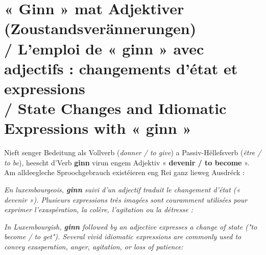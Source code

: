 \vspace{1.5em}

\section[Ginn mat Adjektiver / Ginn with Adjectives]{« Ginn » mat Adjektiver (Zoustandsverännerungen) \\/ L'emploi de « ginn » avec adjectifs : changements d'état et expressions \\/ State Changes and Idiomatic Expressions with « ginn »}

Nieft senger Bedeitung als Vollverb (\textit{donner / to give}) a Passiv-Hëllefsverb (\textit{être / to be}), heescht d'Verb \textbf{ginn} virun engem Adjektiv « \textbf{devenir / to become} ». Am alldeegleche Sproochgebrauch existéieren eng Rei ganz lieweg Ausdréck :

\textit{En luxembourgeois, \textbf{ginn} suivi d'un adjectif traduit le changement d'état (« devenir »). Plusieurs expressions très imagées sont couramment utilisées pour exprimer l'exaspération, la colère, l'agitation ou la détresse :}

\textit{In Luxembourgish, \textbf{ginn} followed by an adjective expresses a change of state ("to become / to get"). Several vivid idiomatic expressions are commonly used to convey exasperation, anger, agitation, or loss of patience:}


